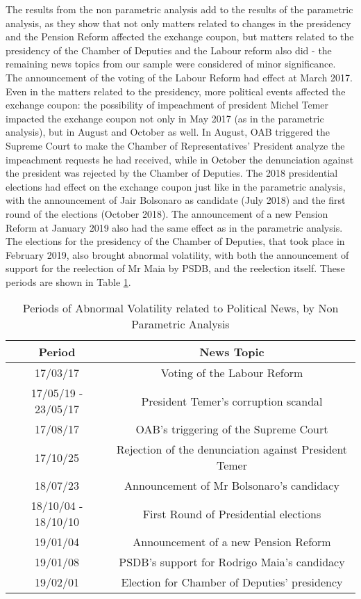 \documentclass[cic,tc, english]{iiufrgs}
\begin{document}
    The results from the non parametric analysis add to the results of the parametric analysis, as they show that not only matters related to changes in the presidency and the Pension Reform affected the exchange coupon, but matters related to the presidency of the Chamber of Deputies and the Labour reform also did - the remaining news topics from our sample were considered of minor significance. The announcement of the voting of the Labour Reform had effect at March 2017. Even in the matters related to the presidency, more political events affected the exchange coupon: the possibility of impeachment of president Michel Temer impacted the exchange coupon not only in May 2017 (as in the parametric analysis), but in August and October as well. In August, OAB triggered the Supreme Court to make the Chamber of Representatives' President analyze the impeachment requests he had received, while in October the denunciation against the president was rejected by the Chamber of Deputies. The 2018 presidential elections had effect on the exchange coupon just like in the parametric analysis, with the announcement of Jair Bolsonaro as candidate (July 2018) and the first round of the elections (October 2018). The announcement of a new Pension Reform at January 2019 also had the same effect as in the parametric analysis. The elections for the presidency of the Chamber of Deputies, that took place in February 2019, also brought abnormal volatility, with both the announcement of support for the reelection of Mr Maia by PSDB, and the reelection itself. These periods are shown in Table \ref{tab:resnon}.

    \begin{table}[H]
        \caption{Periods of Abnormal Volatility related to Political News, by Non Parametric Analysis}
        \label{tab:resnon}
        \centering
        \begin{tabular}{| c | c |}
            \hline
            Period & News Topic \\
            \hline \hline
            17/03/17 & Voting of the Labour Reform \\
            \hline
            17/05/19 - 23/05/17 & President Temer's corruption scandal \\
            \hline
            17/08/17 & OAB's triggering of the Supreme Court \\
            \hline
            17/10/25 & Rejection of the denunciation against President Temer \\
            \hline
            18/07/23 & Announcement of Mr Bolsonaro's candidacy \\
            \hline
            18/10/04 - 18/10/10 & First Round of Presidential elections \\
            \hline
            19/01/04 & Announcement of a new Pension Reform \\
            \hline
            19/01/08 & PSDB's support for Rodrigo Maia's candidacy \\
            \hline
            19/02/01 & Election for Chamber of Deputies' presidency \\
            \hline
        \end{tabular}
    \end{table}
\end{document}
